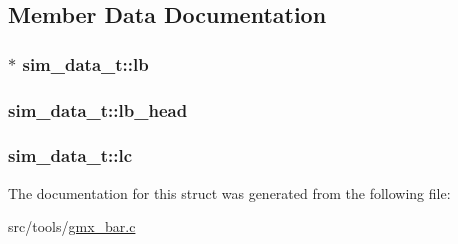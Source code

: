 \subsection{\-Member \-Data \-Documentation}
\hypertarget{structsim__data__t_a63698543a416c5d8e46403e29d1fae3c}{
\subsubsection[{lb}]{$\ast$ {\bf sim\-\_\-data\-\_\-t\-::lb}}}\label{structsim__data__t_a63698543a416c5d8e46403e29d1fae3c}
\hypertarget{structsim__data__t_a1a562fff01d45850679b15cdb16d0ac5}{
\subsubsection[{lb\-\_\-head}]{ {\bf sim\-\_\-data\-\_\-t\-::lb\-\_\-head}}}\label{structsim__data__t_a1a562fff01d45850679b15cdb16d0ac5}
\hypertarget{structsim__data__t_a87d0fa30f1aa672a625fdf35a7584eac}{
\subsubsection[{lc}]{ {\bf sim\-\_\-data\-\_\-t\-::lc}}}\label{structsim__data__t_a87d0fa30f1aa672a625fdf35a7584eac}


\-The documentation for this struct was generated from the following file\-:\begin{DoxyCompactItemize}
\item 
src/tools/\hyperlink{gmx__bar_8c}{gmx\-\_\-bar.\-c}\end{DoxyCompactItemize}
